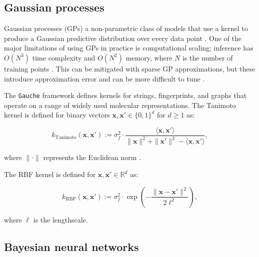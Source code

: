 \subsection{Gaussian processes}

Gaussian processes (GPs) a non-parametric class of models that use a kernel to produce a Gaussian predictive distribution over every data point \citep{Obrezanova2007, Rasmussen2005}. One of the major limitations of using GPs in practice is computational scaling; inference has $O(N^3)$ time complexity and $O(N^2)$ memory, where $N$ is the number of training points \citep{Rasmussen2005}. This can be mitigated with sparse GP approximations, but these introduce approximation error and can be more difficult to tune \citep{quinonero2005}.


The \texttt{Gauche} framework \citep{gauche} defines kernels for strings, fingerprints, and graphs that operate on a range of widely used molecular representations. The Tanimoto kernel \citep{Ralaivola2005, moss2020} is defined for binary vectors $\mathbf{x}, \mathbf{x}' \in \{0, 1\}^d$ for $d \geq 1$ as:

\begin{equation}
k_{\text{Tanimoto}}(\mathbf{x}, \mathbf{x}') := \sigma_f^2 \cdot \frac{\langle \mathbf{x}, \mathbf{x}' \rangle}{\|\mathbf{x}\|^2 + \|\mathbf{x}'\|^2 - \langle \mathbf{x}, \mathbf{x}' \rangle},
\label{eq:tanimoto_kernel}
\end{equation}

where $\|\cdot\|$ represents the Euclidean norm \citep{gauche}. 

The RBF kernel is defined for
$\mathbf{x}, \mathbf{x}' \in \mathbb{R}^d$ as:

\begin{equation}
k_{\text{RBF}}(\mathbf{x}, \mathbf{x}') := \sigma_f^2 \cdot \exp\left(-\frac{\|\mathbf{x} - \mathbf{x}'\|^2}{2\ell^2}\right),
\end{equation}

where $\ell$ is the lengthscale.


\subsection{Bayesian neural networks}

